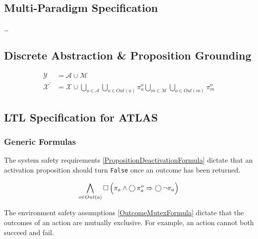 
\subsection{Multi-Paradigm Specification}

\ldots

\subsection{Discrete Abstraction \& Proposition Grounding}


\begin{subequations}
	\begin{align}
		\mathcal{Y} &= \mathcal{A} \cup \mathcal{M}\\
		\mathcal{X}^\prime &= \mathcal{X} \cup \bigcup \limits_{a \in \mathcal{A}} \bigcup \limits_{o \in Out(a)} \pi_a^o \bigcup \limits_{m \in \mathcal{M}} \bigcup \limits_{o \in Out(m)} \pi_m^o
	\end{align}
\end{subequations}

\subsection{LTL Specification for ATLAS}

\subsubsection{Generic Formulas}

The system safety requirements \eqref{PropositionDeactivationFormula} dictate that an activation proposition should turn \texttt{False} once an outcome has been returned.

\begin{equation}\label{PropositionDeactivationFormula}
	\bigwedge \limits_{o \in Out(a)} \operatorname{\Box} \Big( \pi_a \wedge \operatorname{\bigcirc} \pi_a^o \Rightarrow \operatorname{\bigcirc} \lnot \pi_a \Big)
\end{equation}

The environment safety assumptions \eqref{OutcomeMutexFormula} dictate that the outcomes of an action are mutually exclusive. 
For example, an action cannot both succeed and fail.

